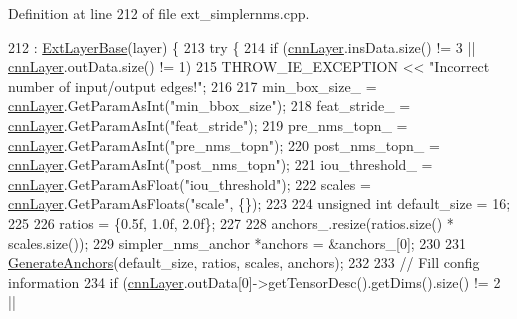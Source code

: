 Definition at line 212 of file ext\+\_\+simplernms.\+cpp.


\begin{DoxyCode}
212                                                   : \hyperlink{classInferenceEngine_1_1Extensions_1_1Cpu_1_1ExtLayerBase_affff0e8263ca26852ccf71d299d7b06a}{ExtLayerBase}(layer) \{
213         \textcolor{keywordflow}{try} \{
214             \textcolor{keywordflow}{if} (\hyperlink{classInferenceEngine_1_1Extensions_1_1Cpu_1_1ExtLayerBase_a1074cdccacb9e9ca6eec01bbc2f7ca4a}{cnnLayer}.insData.size() != 3 || \hyperlink{classInferenceEngine_1_1Extensions_1_1Cpu_1_1ExtLayerBase_a1074cdccacb9e9ca6eec01bbc2f7ca4a}{cnnLayer}.outData.size() != 1)
215                 THROW\_IE\_EXCEPTION << \textcolor{stringliteral}{"Incorrect number of input/output edges!"};
216 
217             min\_box\_size\_ = \hyperlink{classInferenceEngine_1_1Extensions_1_1Cpu_1_1ExtLayerBase_a1074cdccacb9e9ca6eec01bbc2f7ca4a}{cnnLayer}.GetParamAsInt(\textcolor{stringliteral}{"min\_bbox\_size"});
218             feat\_stride\_ = \hyperlink{classInferenceEngine_1_1Extensions_1_1Cpu_1_1ExtLayerBase_a1074cdccacb9e9ca6eec01bbc2f7ca4a}{cnnLayer}.GetParamAsInt(\textcolor{stringliteral}{"feat\_stride"});
219             pre\_nms\_topn\_ = \hyperlink{classInferenceEngine_1_1Extensions_1_1Cpu_1_1ExtLayerBase_a1074cdccacb9e9ca6eec01bbc2f7ca4a}{cnnLayer}.GetParamAsInt(\textcolor{stringliteral}{"pre\_nms\_topn"});
220             post\_nms\_topn\_ = \hyperlink{classInferenceEngine_1_1Extensions_1_1Cpu_1_1ExtLayerBase_a1074cdccacb9e9ca6eec01bbc2f7ca4a}{cnnLayer}.GetParamAsInt(\textcolor{stringliteral}{"post\_nms\_topn"});
221             iou\_threshold\_ = \hyperlink{classInferenceEngine_1_1Extensions_1_1Cpu_1_1ExtLayerBase_a1074cdccacb9e9ca6eec01bbc2f7ca4a}{cnnLayer}.GetParamAsFloat(\textcolor{stringliteral}{"iou\_threshold"});
222             scales = \hyperlink{classInferenceEngine_1_1Extensions_1_1Cpu_1_1ExtLayerBase_a1074cdccacb9e9ca6eec01bbc2f7ca4a}{cnnLayer}.GetParamAsFloats(\textcolor{stringliteral}{"scale"}, \{\});
223 
224             \textcolor{keywordtype}{unsigned} \textcolor{keywordtype}{int} default\_size = 16;
225 
226             ratios = \{0.5f, 1.0f, 2.0f\};
227 
228             anchors\_.resize(ratios.size() * scales.size());
229             simpler\_nms\_anchor *anchors = &anchors\_[0];
230 
231             \hyperlink{namespaceInferenceEngine_1_1Extensions_1_1Cpu_a372135d51e4474280774a7ca10933c84}{GenerateAnchors}(default\_size, ratios, scales, anchors);
232 
233             \textcolor{comment}{// Fill config information}
234             \textcolor{keywordflow}{if} (\hyperlink{classInferenceEngine_1_1Extensions_1_1Cpu_1_1ExtLayerBase_a1074cdccacb9e9ca6eec01bbc2f7ca4a}{cnnLayer}.outData[0]->getTensorDesc().getDims().size() != 2 ||

\end{DoxyCode}
